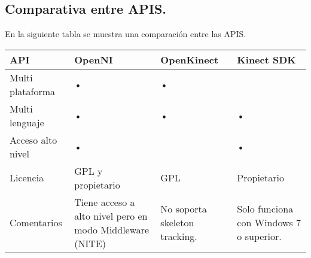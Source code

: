 \documentclass[11pt,a4paper]{article}
\begin{document}
\newpage
\subsection{Comparativa entre APIS.}
En la siguiente tabla se muestra una comparación entre las APIS.

\begin{tabular}{||p{2.5cm}||p{2.5cm}||p{2.5cm}||p{2.5cm}||}
\hline API & OpenNI & OpenKinect & Kinect SDK \\ 
\hline Multi plataforma & • & • &  \\ 
\hline Multi lenguaje & • & • & • \\ 
\hline Acceso alto nivel & • &  & • \\ 
\hline Licencia & GPL y propietario & GPL & Propietario \\ 
\hline Comentarios & Tiene acceso a alto nivel pero en modo Middleware (NITE) & No soporta skeleton tracking. & Solo funciona con Windows 7 o superior. \\ 
\hline 
\end{tabular} 
\end{document}
